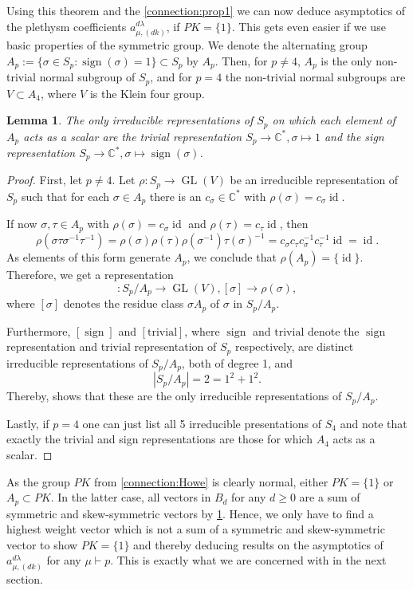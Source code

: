 \documentclass[a4paper]{amsart}
\newtheorem{lemma}{Lemma}
\def\C{{\mathbb{C}}}
\DeclareMathOperator{\sign}{\mathrm{sign}}
\DeclareMathOperator{\GL}{\mathrm{GL}}
\DeclareMathOperator{\id}{\mathrm{id}}
\newcommand{\abs}[1]{\left| #1\right|}
\begin{document}
Using this theorem and the \cref{connection:prop1} we can now deduce asymptotics of the plethysm coefficients $a_{\mu,(dk)}^{d\lambda}$, if $PK=\{1\}$.
This gets even easier if we use basic properties of the symmetric group.
We denote the alternating group $A_p:=\{\sigma\in S_p:\sign(\sigma)=1\}\subset S_p$ by $A_p$.
Then, for $p\neq 4$, $A_p$ is the only non-trivial normal subgroup of $S_p$, and for $p=4$ the non-trivial normal subgroups are $V\subset A_4$, where $V$ is the Klein four group.
\begin{lemma}\label{connection:cor3}
The only irreducible representations of $S_p$ on which each element of $A_p$ acts as a scalar are the trivial representation $S_p\to\C^*,\sigma\mapsto1$ and the sign representation $S_p\to\C^*,\sigma\mapsto\sign(\sigma)$.
\end{lemma}
\begin{proof}
	First, let $p\neq 4$.
	Let $\rho:S_p\to\GL(V)$ be an irreducible representation of $S_p$ such that for each $\sigma\in A_p$ there is an $c_\sigma\in\C^*$ with $\rho(\sigma)=c_\sigma\id$.
	
	If now $\sigma,\tau\in A_p$ with $\rho(\sigma)=c_\sigma\id$ and $\rho(\tau)=c_\tau\id$,
	then
	\begin{displaymath}
		\rho(\sigma\tau\sigma^{-1}\tau^{-1})=
		\rho(\sigma)\rho(\tau)\rho(\sigma^{-1})\tau(\sigma)^{-1}=
		c_\sigma c_\tau c_\sigma^{-1} c_\tau^{-1} \id=\id.
	\end{displaymath}
	As elements of this form generate $A_p$,
	we conclude that $\rho(A_p)=\{\id\}$.
	Therefore, we get a representation
	\begin{displaymath}
		[\rho]:S_p/A_p\to\GL(V),[\sigma]\to\rho(\sigma),
	\end{displaymath}
	where $[\sigma]$ denotes the residue class $\sigma A_p$ of $\sigma$ in $S_p/A_p$.
	
	Furthermore,
	$[\sign]$ and $[\mathrm{trivial}]$,
	where $\sign$ and $\mathrm{trivial}$ denote the $\sign$ representation and trivial representation of $S_p$ respectively,
	are distinct irreducible representations of $S_p/A_p$, both of degree 1,
	and
	\begin{displaymath}
		\abs{S_p/A_p}=2=1^2+1^2.
	\end{displaymath}
	Thereby, \cite[Cor. 2.18]{FH04} shows that these are the only irreducible representations of $S_p/A_p$.
		
	Lastly, if $p=4$ one can just list all 5 irreducible presentations of $S_4$ and note that exactly the trivial and sign representations are those for which $A_4$ acts as a scalar.
\end{proof}
As the group $PK$ from \cref{connection:Howe} is clearly normal, either $PK=\{1\}$ or $A_p\subset PK$.
In the latter case, all vectors in $B_d$ for any $d\geq 0$ are a sum of symmetric and skew-symmetric vectors by \cref{connection:cor3}.
Hence, we only have to find a highest weight vector which is not a sum of a symmetric and skew-symmetric vector to show $PK=\{1\}$ and thereby deducing results on the asymptotics of $a_{\mu,(dk)}^{d\lambda}$ for any $\mu\vdash p$.
This is exactly what we are concerned with in the next section.
\end{document}
